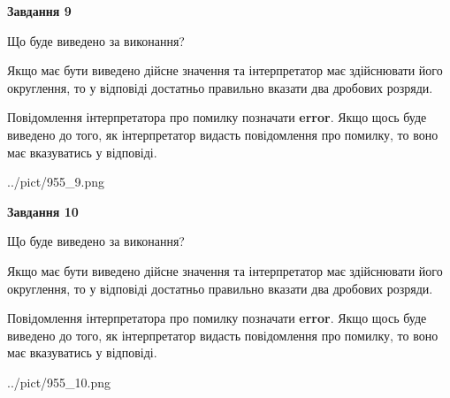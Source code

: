 \documentclass[12pt, ukrainian]{article}
\begin{document}
{\begin {Large}
{\begin {center}\textbf{Завдання 9}\end {center}}\par
Що буде виведено за виконання? \par

Якщо має бути виведено дійсне значення та інтерпретатор має здійснювати його округлення, 
то у відповіді достатньо правильно вказати два дробових розряди.

Повідомлення інтерпретатора про помилку позначати \textbf{error}.
Якщо щось буде виведено до того, як інтерпретатор видасть повідомлення про помилку, 
то воно має вказуватись у відповіді. \par

\begin{center}
	{../pict/955_9.png}
\end{center}
\newpage

{\begin {center}\textbf{Завдання 10}\end {center}}\par
Що буде виведено за виконання? \par

Якщо має бути виведено дійсне значення та інтерпретатор має здійснювати його округлення, 
то у відповіді достатньо правильно вказати два дробових розряди.

Повідомлення інтерпретатора про помилку позначати \textbf{error}.
Якщо щось буде виведено до того, як інтерпретатор видасть повідомлення про помилку, 
то воно має вказуватись у відповіді. \par

\begin{center}
	{../pict/955_10.png}
\end{center}
\newpage

\end {Large}}
\end{document}
